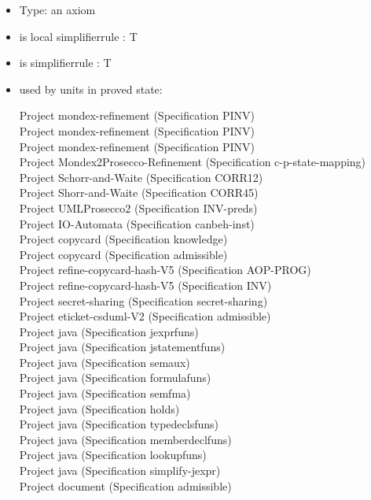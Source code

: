 \documentclass[a4paper]{article}
\begin{document}
\begin{itemize}

\item Type: an axiom

\item is local simplifierrule : T
\item is simplifierrule : T
\item used by units in proved state:

Project mondex-refinement (Specification PINV) \\
Project mondex-refinement (Specification PINV) \\
Project mondex-refinement (Specification PINV) \\
Project Mondex2Prosecco-Refinement (Specification c-p-state-mapping) \\
Project Schorr-and-Waite (Specification CORR12) \\
Project Shorr-and-Waite (Specification CORR45) \\
Project UMLProsecco2 (Specification INV-preds) \\
Project IO-Automata (Specification canbeh-inst) \\
Project copycard (Specification knowledge) \\
Project copycard (Specification admissible) \\
Project refine-copycard-hash-V5 (Specification AOP-PROG) \\
Project refine-copycard-hash-V5 (Specification INV) \\
Project secret-sharing (Specification secret-sharing) \\
Project eticket-csduml-V2 (Specification admissible) \\
Project java (Specification jexprfuns) \\
Project java (Specification jstatementfuns) \\
Project java (Specification semaux) \\
Project java (Specification formulafuns) \\
Project java (Specification semfma) \\
Project java (Specification holds) \\
Project java (Specification typedeclsfuns) \\
Project java (Specification memberdeclfuns) \\
Project java (Specification lookupfuns) \\
Project java (Specification simplify-jexpr) \\
Project document (Specification admissible) \\

\end{itemize}
\end{document}

